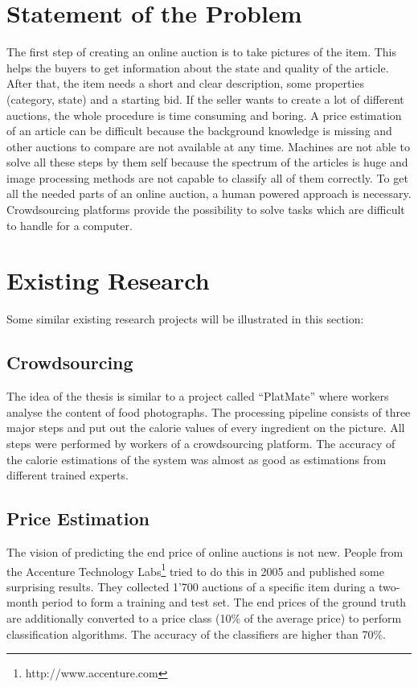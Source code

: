 \documentclass[a4paper]{report}
\begin{document}
\section{Statement of the Problem}
The first step of creating an online auction is to take pictures of the item. This helps the buyers to get information about the state and quality of the article. After that, the item needs a short and clear description, some properties (category, state) and a starting bid. If the seller wants to create a lot of different auctions, the whole procedure is time consuming and boring. A price estimation of an article can be difficult because the background knowledge is missing and other auctions to compare are not available at any time. Machines are not able to solve all these steps by them self because the spectrum of the articles is huge and image processing methods are not capable to classify all of them correctly. To get all the needed parts of an online auction, a human powered approach is necessary. Crowdsourcing platforms provide the possibility to solve tasks which are difficult to handle for a computer.

\section{Existing Research}
Some similar existing research projects will be illustrated in this section: 
\subsection{Crowdsourcing}
The idea of the thesis is similar to a project called ``PlatMate''\cite{platemate} where workers analyse the content of food photographs. The processing pipeline consists of three major steps and put out the calorie values of every ingredient on the picture. All steps were performed by workers of a crowdsourcing platform. The accuracy of the calorie estimations of the system was almost as good as estimations from different trained experts. 
\subsection{Price Estimation}
The vision of predicting the end price of online auctions is not new. People from the Accenture Technology Labs\footnote{http://www.accenture.com} tried to do this in 2005 and published some surprising results\cite{ghani}. They collected 1'700 auctions of a specific item during a two-month period to form a training and test set. The end prices of the ground truth are additionally converted to a price class (10\% of the average price) to perform classification algorithms. The accuracy of the classifiers are higher than 70\%.
\end{document}
